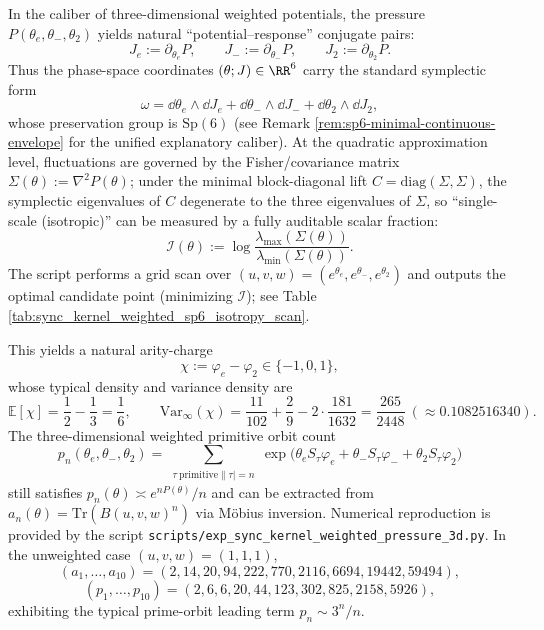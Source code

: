 \begin{remark}\label{rem:sync-kernel-3d-sp6-isotropy-scan}
In the caliber of three-dimensional weighted potentials, the pressure \(P(\theta_e,\theta_-,\theta_2)\) yields natural ``potential--response'' conjugate pairs:
\[
J_e:=\partial_{\theta_e}P,\qquad
J_-:=\partial_{\theta_-}P,\qquad
J_2:=\partial_{\theta_2}P.
\]
Thus the phase-space coordinates \((\theta;J)\in\RR^6\) carry the standard symplectic form
\[
\omega=\dd\theta_e\wedge \dd J_e+\dd\theta_-\wedge \dd J_-+\dd\theta_2\wedge \dd J_2,
\]
whose preservation group is \(\mathrm{Sp}(6)\) (see Remark \ref{rem:sp6-minimal-continuous-envelope} for the unified explanatory caliber).
At the quadratic approximation level, fluctuations are governed by the Fisher/covariance matrix
\(
\Sigma(\theta):=\nabla^2P(\theta)
\);
under the minimal block-diagonal lift \(C=\mathrm{diag}(\Sigma,\Sigma)\), the symplectic eigenvalues of \(C\) degenerate to the three eigenvalues of \(\Sigma\),
so ``single-scale (isotropic)'' can be measured by a fully auditable scalar fraction:
\[
\mathcal{I}(\theta):=\log\frac{\lambda_{\max}(\Sigma(\theta))}{\lambda_{\min}(\Sigma(\theta))}.
\]
The script \texttt{} performs a grid scan over \((u,v,w)=(e^{\theta_e},e^{\theta_-},e^{\theta_2})\) and outputs the optimal candidate point (minimizing \(\mathcal{I}\)); see Table \ref{tab:sync_kernel_weighted_sp6_isotropy_scan}.
\end{remark}


This yields a natural arity-charge
\[
\chi:=\varphi_e-\varphi_2\in\{-1,0,1\},
\]
whose typical density and variance density are
\[
\mathbb{E}[\chi]=\frac12-\frac13=\frac16,\qquad
\mathrm{Var}_\infty(\chi)=\frac{11}{102}+\frac{2}{9}-2\cdot\frac{181}{1632}=\frac{265}{2448}\ (\approx 0.1082516340).
\]
The three-dimensional weighted primitive orbit count
\[
p_n(\theta_e,\theta_-,\theta_2)=\sum_{\substack{\tau\ \mathrm{primitive}\|\tau|=n}}
\exp\!\bigl(\theta_e S_\tau\varphi_e+\theta_-S_\tau\varphi_-+\theta_2S_\tau\varphi_2\bigr)
\]
still satisfies $p_n(\theta)\asymp e^{nP(\theta)}/n$ and can be extracted from
$a_n(\theta)=\mathrm{Tr}(B(u,v,w)^n)$ via M\"obius inversion. Numerical reproduction is provided by the script \texttt{scripts/exp\_sync\_kernel\_weighted\_pressure\_3d.py}.
In the unweighted case $(u,v,w)=(1,1,1)$,
\[
(a_1,\dots,a_{10})=(2,14,20,94,222,770,2116,6694,19442,59494),
\]
\[
(p_1,\dots,p_{10})=(2,6,6,20,44,123,302,825,2158,5926),
\]
exhibiting the typical prime-orbit leading term $p_n\sim 3^n/n$.

